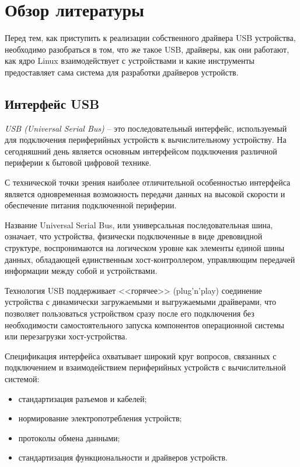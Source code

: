 \section{Обзор литературы}

Перед тем, как приступить к реализации собственного драйвера USB устройства,
необходимо разобраться в том, что же такое USB,
драйверы, как они работают, как ядро Linux взаимодействует с устройствами
и какие инструменты предоставляет сама система для разработки драйверов устройств.

\subsection{Интерфейс USB}

\emph{USB (Universal Serial Bus)} -- это последовательный интерфейс, используемый для подключения
периферийных устройств к вычислительному устройству. На сегодняшний день является
основным интерфейсом подключения различной периферии к бытовой цифровой технике.

С технической точки зрения наиболее отличительной особенностью интерфейса 
является одновременная возможность передачи данных на высокой скорости
и обеспечение питания подключенной периферии.

Название Universal Serial Bus, или универсальная последовательная шина,
означает, что устройства, физически подключенные в виде древовидной структуре,
воспронимаются на логическом уровне как элементы единой шины данных, обладающей единственным
хост-контроллером, управляющим передачей информации между собой и устройствами.

Технология USB поддерживает <<горячее>> (plug'n'play) соединение устройства
с динамически загружаемыми и выгружаемыми драйверами, что позволяет пользоваться
устройством сразу после его подключения без необходимости самостоятельного запуска компонентов
операционной системы или перезагрузки хост-устройства.

Спецификация интерфейса охватывает широкий круг вопросов,
связанных с подключением и взаимодействием
периферийных устройств с вычислительной системой:
\begin{itemize}
    \item стандартизация разъемов и кабелей;
    \item нормирование электропотребления устройств;
    \item протоколы обмена данными;
    \item стандартизация функциональности и драйверов устройств.
\end{itemize}

